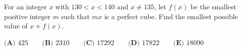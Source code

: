 For an integer $x$ with $130<x<140$ and $x\ne135$, let $f(x)$ be the smallest positive integer $m$ such that $mx$ is a perfect cube. Find the smallest possible value of $x+f(x)$.

$\textbf{(A) } 425 \qquad \textbf{(B) } 2310 \qquad \textbf{(C) } 17292 \qquad \textbf{(D) } 17822 \qquad \textbf{(E) } 18090$
